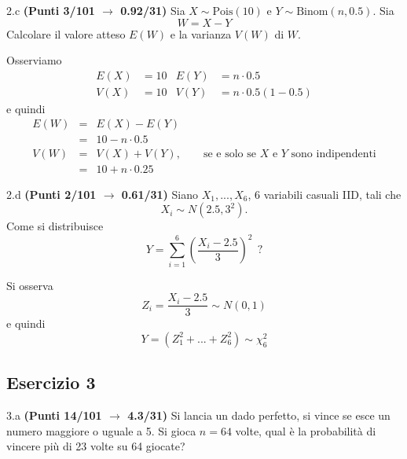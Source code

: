 \documentclass[
  11pt,
]{book}
\theoremstyle{mytheoremstyle}
\theoremstyle{mydefstyle}
\newenvironment{sol}
  {
  \begin{tcolorbox}[enhanced,breakable,arc=0.1mm,boxrule=1pt,colback=white,colframe=iblue,
  title=\bf \fontfamily{lmss}\selectfont \hspace{.5 cm} Soluzione,drop fuzzy shadow]

}{
\end{tcolorbox}
  }
\begin{document}
2.c \textbf{(Punti 3/101 \(\rightarrow\) 0.92/31)} Sia \(X\sim \text{Pois}(10)\) e \(Y\sim\text{Binom}(n,0.5)\).
Sia
\[
W=X-Y
\]
Calcolare il valore atteso \(E(W)\) e la varianza \(V(W)\) di \(W\).

\begin{sol}
Osserviamo
\begin{align*}
E(X)&=10 &E(Y)&=n\cdot 0.5\\
V(X)&=10 &V(Y)&=n\cdot0.5(1-0.5)
\end{align*}
e quindi
\begin{eqnarray*}
E(W)&=&E(X)-E(Y)\\
&=&10-n\cdot 0.5\\
V(W)&=&V(X)+V(Y),\qquad\text{se e solo se $X$ e $Y$ sono indipendenti}\\
&=&10+n\cdot 0.25
\end{eqnarray*}

\end{sol}

2.d \textbf{(Punti 2/101 \(\rightarrow\) 0.61/31)} Siano \(X_1,...,X_6\), \(6\) variabili casuali IID,
tali che
\[
X_i\sim N\left(2.5,3^2\right).
\]
Come si distribuisce
\[
Y=\sum_{i=1}^6\left(\frac{X_i-2.5}{3}\right)^2~~?
\]

\begin{sol}
Si osserva
\[
Z_i=\frac{X_i-2.5}{3}\sim N(0,1)
\]
e quindi
\[
Y=(Z_1^2+...+Z_6^2)\sim\chi_6^2
\]

\end{sol}

\subsection{Esercizio 3}\label{esercizio-3-5}

3.a \textbf{(Punti 14/101 \(\rightarrow\) 4.3/31)} Si lancia un dado perfetto, si vince se esce un numero maggiore o uguale a 5.
Si gioca \(n=64\) volte, qual è la probabilità di vincere più di 23 volte su 64 giocate?
\end{document}
